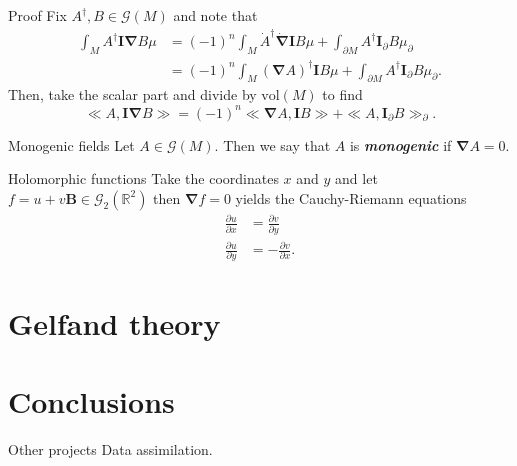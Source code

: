 \documentclass[aspectratio=169,handout]{beamer}
\newcommand\boldgreen[1]{\textcolor{lighter_csu_green}{\emph{\textbf{#1}}}}
\newcommand{\R}{\mathbb{R}}
\newcommand{\grad}{\boldsymbol{\nabla}}
\newcommand{\G}{\mathcal{G}}
\newcommand{\blade}[1]{\boldsymbol{#1}}
\newcommand{\multivecinnerproduct}[2]{\ll #1, #2\gg}
\newcommand{\pseudoscalar}{\blade{I}}
\begin{document}
\begin{frame}{Proof}
Fix $A^\dagger,B \in \G(M)$ and note that
\begin{align*}
    \int_M A^\dagger \pseudoscalar \grad B \mu &= (-1)^n \int_M \dot{A}^\dagger \dot{\grad} \pseudoscalar B \mu + \int_{\partial M} A^\dagger \pseudoscalar_\partial B \mu_\partial\\
    &=(-1)^n \int_M (\grad A)^\dagger \pseudoscalar B \mu + \int_{\partial M} A^\dagger \pseudoscalar_\partial B \mu_\partial.
\end{align*}
Then, take the scalar part and divide by $\textrm{vol}(M)$ to find
\[
\multivecinnerproduct{A}{\pseudoscalar \grad B} = (-1)^n \multivecinnerproduct{\grad A}{\pseudoscalar B} + \multivecinnerproduct{A}{\pseudoscalar_\partial B}_\partial.
\]
\end{frame}

\begin{frame}{Monogenic fields}
Let $A\in \G(M)$. Then we say that $A$ is \boldgreen{monogenic} if $\grad A = 0$.
\end{frame}

\begin{frame}{Holomorphic functions}
Take the coordinates $x$ and $y$ and let $f=u+v\blade{B} \in \G_2(\R^2)$ then $\grad f = 0$ yields the Cauchy-Riemann equations
\begin{align*}
    \frac{\partial u}{\partial x} &= \frac{\partial v}{\partial y}\\
    \frac{\partial u}{\partial y} &= -\frac{\partial v}{\partial x}.
\end{align*}
\end{frame}

\section{Gelfand theory}


\section{Conclusions}

\begin{frame}{Other projects}
Data assimilation.
\end{frame}
\end{document}
